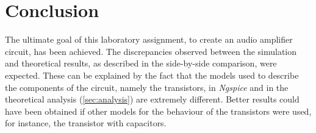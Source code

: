 %             
%             







\section{Conclusion}
\label{sec:conclusion}


The ultimate goal of this laboratory assignment, to create an audio amplifier 
circuit, has been achieved.
The discrepancies observed between the simulation and theoretical results, 
as described in the side-by-side comparison, were expected.
These can be explained by the fact that the models used to describe the 
components of the circuit, namely the transistors, in \textit{Ngspice} 
and in the theoretical analysis (\ref{sec:analysis}) are extremely 
different. Better results could have been obtained if other models 
for the behaviour of the transistors were used, for instance, the 
transistor with capacitors.


